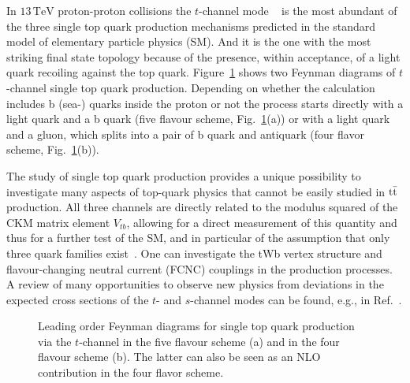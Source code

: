 In $13\,\mathrm{TeV}$ proton-proton collisions the $t$-channel mode ~\cite{firstharris,firsttramontano,firstkidonakis} is the most abundant of the three single top quark production mechanisms predicted in the standard model of elementary particle physics (SM). And it is the one with the most striking final state topology because of the presence, 
within acceptance, of a light quark recoiling against the top quark. Figure~\ref{fig:FG} shows two Feynman diagrams of $t$-channel single top quark production. Depending on whether the calculation includes b (sea-) quarks inside the proton or not the process starts directly with a light quark and a b quark (five flavour scheme, Fig.~\ref{fig:FG}(a)) or with a light quark and a gluon, which splits into a pair of b quark and antiquark (four flavor scheme, Fig.~\ref{fig:FG}(b)).

The study of single top quark production provides a unique possibility to investigate many aspects 
of top-quark physics that cannot be easily studied in $\mathrm{t}\bar{\mathrm{t}}$ production. All three channels 
are directly related to the modulus squared of the CKM matrix element $V_{tb}$, allowing for a 
direct measurement of this quantity and thus for a further test of the SM, 
and in particular of the assumption that only three quark families exist~\cite{Alwall:2006bx,Holdom:2009rf}. 
One can investigate the tWb vertex structure and flavour-changing neutral current (FCNC) couplings in the production processes.
A review of many opportunities to observe new physics 
from deviations in the expected cross sections of the $t$- and $s$-channel modes can be found, e.g., in Ref.~\cite{Tait:2000sh}. 

	\begin{figure}[h]
	  \begin{center}
	    \hfill
	    \caption{\label{fig:FG}Leading order Feynman diagrams for single top quark production via the $t$-channel in the five flavour scheme (a) and in the four flavour scheme (b). The latter can also be seen as an NLO contribution in the four flavor scheme.}
	  \end{center}
	\end{figure}

